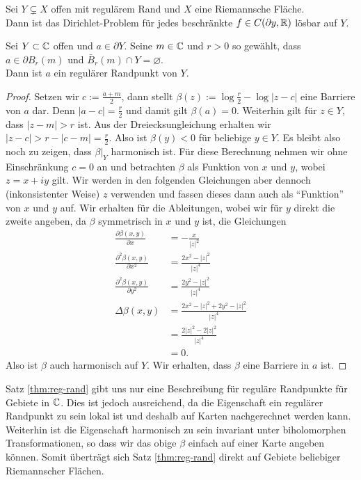 \begin{thm}
  \label{thm:dirichlet}
  Sei $Y \subsetneq X$ offen mit regulärem Rand und $X$ eine
  Riemannsche Fläche. \\
  Dann ist das Dirichlet-Problem für jedes beschränkte $f \in
  C(\partial y, \mathbb{R})$ lösbar auf $Y$.
\end{thm}

\begin{thm}
  \label{thm:reg-rand}
  Sei $Y \subset \mathbb{C}$ offen und $a \in \partial Y$. Seine $m \in \mathbb{C}$
  und $r > 0$ so gewählt, dass $a \in \partial B_r(m)$ und $\bar
  B_r(m) \cap Y = \varnothing$.\\
  Dann ist $a$ ein regulärer Randpunkt von $Y$.
\end{thm}

\begin{proof}
  Setzen wir $c := \frac{a+m}{2}$, dann stellt $\beta(z) := \log
  \frac{r}{2} - \log|z-c|$ eine Barriere von $a$ dar. Denn $|a - c| =
  \frac{r}{2}$ und damit gilt $\beta(a) = 0$. Weiterhin gilt für $z
  \in Y$, dass $|z-m| > r$ ist. Aus der Dreiecksungleichung erhalten
  wir $|z-c| > r - |c-m| = \frac{r}{2}$. Also ist $\beta(y) < 0$ für
  beliebige $y \in Y$. Es bleibt also noch zu zeigen, dass $\beta|_Y$
  harmonisch ist. Für diese Berechnung nehmen wir ohne Einschränkung
  $c = 0$ an und betrachten $\beta$ als Funktion von $x$ und $y$,
  wobei $z = x + iy$ gilt. Wir werden in den folgenden Gleichungen
  aber dennoch (inkonsistenter Weise) $z$ verwenden und fassen dieses
  dann auch als "`Funktion"' von $x$ und $y$ auf. Wir erhalten für die
  Ableitungen, wobei wir für $y$ direkt die zweite angeben, da $\beta$
  symmetrisch in $x$ und $y$ ist, die Gleichungen 
  \begin{align*}
    \frac{\partial \beta(x,y)}{\partial x} & = - \frac{x}{|z|^2} \\
    \frac{\partial^2 \beta(x,y)}{\partial x^2} & = \frac{2x^2 -
      |z|^2}{|z|^4} \\
    \frac{\partial^2 \beta(x,y)}{\partial y^2} & = \frac{2y^2 -
      |z|^2}{|z|^4} \\
    \Delta \beta(x,y) & = \frac{2 x^2 - |z|^2 + 2y^2 -|z|^2}{|z|^4} \\
    & = \frac{2 |z|^2 - 2|z|^2}{|z|^4} \\
    & = 0.
  \end{align*}
  Also ist $\beta$ auch harmonisch auf $Y$. Wir erhalten, dass $\beta$
  eine Barriere in $a$ ist.
\end{proof}

\begin{rem}
  Satz \ref{thm:reg-rand} gibt uns nur eine Beschreibung für reguläre
  Randpunkte für Gebiete in $\mathbb{C}$. Dies ist jedoch ausreichend, da die
  Eigenschaft ein regulärer Randpunkt zu sein lokal ist und deshalb
  auf Karten nachgerechnet werden kann. Weiterhin ist die Eigenschaft
  harmonisch zu sein invariant unter biholomorphen Transformationen,
  so dass wir das obige $\beta$ einfach auf einer Karte angeben
  können. Somit überträgt sich Satz \ref{thm:reg-rand} direkt auf
  Gebiete beliebiger Riemannscher Flächen.
\end{rem}


